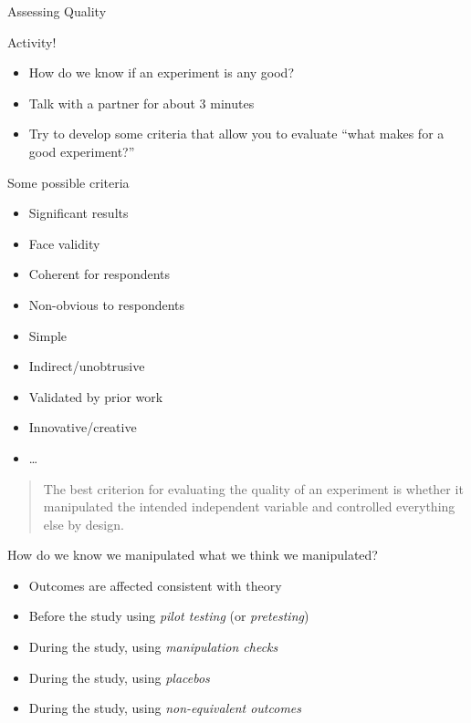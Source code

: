 \documentclass[
  ignorenonframetext,
]{beamer}
\begin{document}
\begin{frame}{Assessing Quality}
\protect\hypertarget{assessing-quality}{}
\end{frame}

\begin{frame}{Activity!}
\protect\hypertarget{activity}{}
\begin{itemize}\itemsep0.5em
\item How do we know if an experiment is any good?
\item Talk with a partner for about 3 minutes
\item Try to develop some criteria that allow you to evaluate ``what makes for a good experiment?'' 
\end{itemize}
\end{frame}

\begin{frame}{Some possible criteria}
\protect\hypertarget{some-possible-criteria}{}
\small

\begin{itemize}\itemsep-0.2em
\item Significant results
\item Face validity
\item Coherent for respondents
\item Non-obvious to respondents
\item Simple
\item Indirect/unobtrusive
\item Validated by prior work
\item Innovative/creative
\item \dots
\end{itemize}
\end{frame}

\begin{frame}{}
\protect\hypertarget{section}{}
\begin{quote}\large
The best criterion for evaluating the quality of an experiment is whether it manipulated the intended independent variable and controlled everything else by design.
\end{quote}
\end{frame}

\begin{frame}{How do we know we manipulated what we think we
manipulated?}
\protect\hypertarget{how-do-we-know-we-manipulated-what-we-think-we-manipulated}{}
\small

\begin{itemize}
\item<2-> Outcomes are affected consistent with theory
\item<3-> Before the study using \textit{pilot testing} (or \emph{pretesting})
\item<4-> During the study, using \emph{manipulation checks}
\item<5-> During the study, using \emph{placebos}
\item<6-> During the study, using \textit{non-equivalent outcomes}
\end{itemize}
\end{frame}
\end{document}
